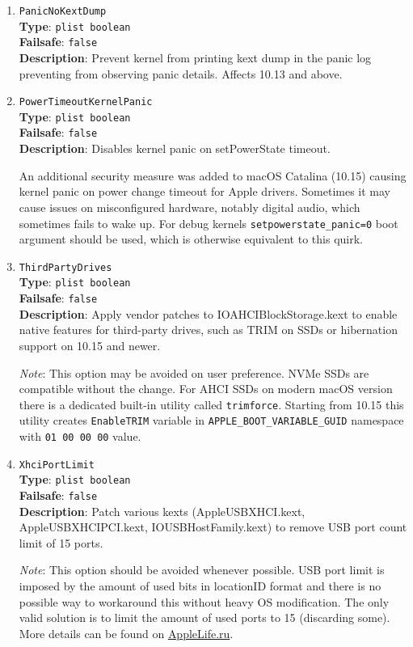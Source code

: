 \documentclass[]{article}
\begin{document}
\begin{enumerate}
\item
  \texttt{PanicNoKextDump}\\
  \textbf{Type}: \texttt{plist\ boolean}\\
  \textbf{Failsafe}: \texttt{false}\\
  \textbf{Description}: Prevent kernel from printing kext dump in the panic
  log preventing from observing panic details. Affects 10.13 and above.

\item
  \texttt{PowerTimeoutKernelPanic}\\
  \textbf{Type}: \texttt{plist\ boolean}\\
  \textbf{Failsafe}: \texttt{false}\\
  \textbf{Description}: Disables kernel panic on setPowerState timeout.

  An additional security measure was added to macOS Catalina (10.15) causing
  kernel panic on power change timeout for Apple drivers. Sometimes it may cause
  issues on misconfigured hardware, notably digital audio, which sometimes fails
  to wake up. For debug kernels \texttt{setpowerstate\_panic=0} boot argument
  should be used, which is otherwise equivalent to this quirk.

\item
  \texttt{ThirdPartyDrives}\\
  \textbf{Type}: \texttt{plist\ boolean}\\
  \textbf{Failsafe}: \texttt{false}\\
  \textbf{Description}: Apply vendor patches to IOAHCIBlockStorage.kext to enable
  native features for third-party drives, such as TRIM on SSDs or hibernation
  support on 10.15 and newer.

  \emph{Note}: This option may be avoided on user preference. NVMe SSDs are
  compatible without the change. For AHCI SSDs on modern macOS version there
  is a dedicated built-in utility called \texttt{trimforce}. Starting from 10.15
  this utility creates \texttt{EnableTRIM} variable in \texttt{APPLE\_BOOT\_VARIABLE\_GUID}
  namespace with \texttt{01 00 00 00} value.

\item
  \texttt{XhciPortLimit}\\
  \textbf{Type}: \texttt{plist\ boolean}\\
  \textbf{Failsafe}: \texttt{false}\\
  \textbf{Description}: Patch various kexts (AppleUSBXHCI.kext, AppleUSBXHCIPCI.kext,
  IOUSBHostFamily.kext) to remove USB port count limit of 15 ports.

  \emph{Note}: This option should be avoided whenever possible. USB port limit
  is imposed by the amount of used bits in locationID format and there is no
  possible way to workaround this without heavy OS modification. The only
  valid solution is to limit the amount of used ports to 15 (discarding some).
  More details can be found on \href{https://applelife.ru/posts/550233}{AppleLife.ru}.

\end{enumerate}
\end{document}
